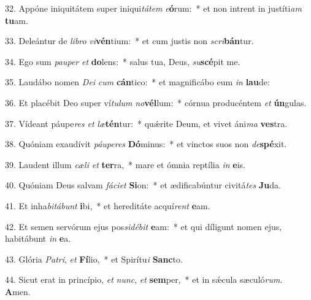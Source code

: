 32. Appóne iniquitátem super iniqui\textit{tá}\textit{tem} \textit{e}\textbf{ó}rum:~*  et non intrent in justíti\textit{am} \textbf{tu}am.\

33. Deleántur de \textit{li}\textit{bro} \textit{vi}\textbf{vén}tium:~*  et cum justis non \textit{scri}\textbf{bán}tur.\

34. Ego sum \textit{pau}\textit{per} \textit{et} \textbf{do}lens:~*  salus tua, Deus, \textit{su}\textbf{scé}pit me.\

35. Laudábo nomen \textit{De}\textit{i} \textit{cum} \textbf{cán}tico:~*  et magnificábo eum \textit{in} \textbf{lau}de:\

36. Et placébit Deo super ví\textit{tu}\textit{lum} \textit{no}\textbf{vél}lum:~*  córnua producéntem \textit{et} \textbf{ún}gulas.\

37. Vídeant páupe\textit{res} \textit{et} \textit{læ}\textbf{tén}tur:~*  quǽrite Deum, et vivet áni\textit{ma} \textbf{ves}tra.\

38. Quóniam exaudívit \textit{páu}\textit{pe}\textit{res} \textbf{Dó}minus:~*  et vinctos suos non \textit{de}\textbf{spé}xit.\

39. Laudent illum \textit{cæ}\textit{li} \textit{et} \textbf{ter}ra,~*  mare et ómnia reptília \textit{in} \textbf{e}is.\

40. Quóniam Deus salvam \textit{fá}\textit{ci}\textit{et} \textbf{Si}on:~*  et ædificabúntur civitá\textit{tes} \textbf{Ju}da.\

41. Et inha\textit{bi}\textit{tá}\textit{bunt} \textbf{i}bi,~*  et hereditáte acquí\textit{rent} \textbf{e}am.\

42. Et semen servórum ejus pos\textit{si}\textit{dé}\textit{bit} \textbf{e}am:~*  et qui díligunt nomen ejus, habitábunt \textit{in} \textbf{e}a.\

43. Glória \textit{Pa}\textit{tri}, \textit{et} \textbf{Fí}lio,~*  et Spirítu\textit{i} \textbf{Sanc}to.\

44. Sicut erat in princípio, \textit{et} \textit{nunc}, \textit{et} \textbf{sem}per,~*  et in sǽcula sæculó\textit{rum}. \textbf{A}men.\

